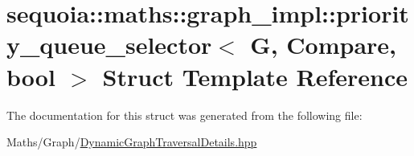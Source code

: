 \hypertarget{structsequoia_1_1maths_1_1graph__impl_1_1priority__queue__selector}{}\section{sequoia\+::maths\+::graph\+\_\+impl\+::priority\+\_\+queue\+\_\+selector$<$ G, Compare, bool $>$ Struct Template Reference}
\label{structsequoia_1_1maths_1_1graph__impl_1_1priority__queue__selector}


The documentation for this struct was generated from the following file\+:\begin{DoxyCompactItemize}
\item 
Maths/\+Graph/\mbox{\hyperlink{_dynamic_graph_traversal_details_8hpp}{Dynamic\+Graph\+Traversal\+Details.\+hpp}}\end{DoxyCompactItemize}
